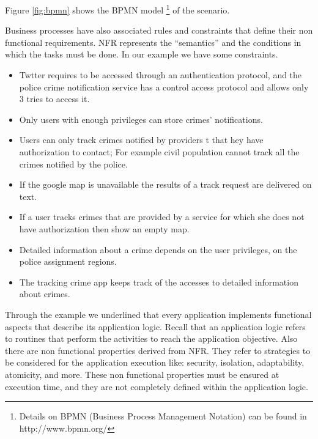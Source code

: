Figure \ref{fig:bpmn} shows the BPMN model  \footnote{Details on BPMN (Business Process Management Notation) can be found in http://www.bpmn.org/} of the scenario. 


Business processes have also associated rules and constraints that define their non functional requirements.  
NFR represents the “semantics” and the conditions in which the tasks must be done. 
In our example we have some constraints. 
\begin{itemize}
\item Twtter requires to be accessed through an authentication protocol, and the police crime notification service has a control  access protocol and allows only 3 tries to access it. 
\item Only users with enough privileges can store crimes’ notifications. 
\item Users can only track crimes notified by providers t that hey have authorization to contact; For example civil population cannot track all the crimes notified by the police. 
\item If the google map is unavailable the results of a track request are delivered on text. 
\item If a user tracks crimes that are provided by a service for which she does not have authorization then show an empty map. 
\item Detailed information about a crime depends on the user privileges, on the police assignment regions. 
\item The tracking crime app keeps track of the accesses to detailed information about crimes. 
\end{itemize}

Through the example we underlined that every application implements functional aspects that describe its application logic. Recall that an application logic refers to routines that perform the activities to reach the application objective.
Also there are non functional properties derived from NFR. They refer to strategies to be considered for the application execution like: security, isolation, adaptability, atomicity, and more.
These non functional properties must be ensured at execution time, and they are not completely defined within the application logic.

